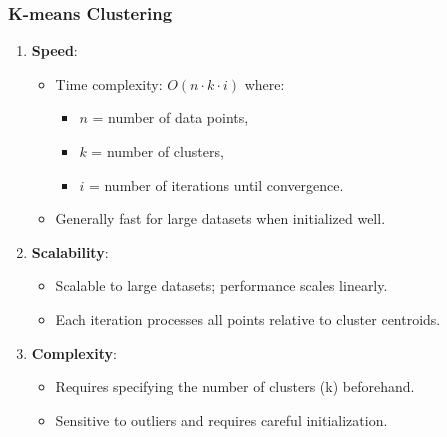 \documentclass{beamer}
\begin{document}
\begin{frame}[fragile]
    \frametitle{K-means Clustering}
    \begin{enumerate}
        \item \textbf{Speed}:
        \begin{itemize}
            \item Time complexity: \( O(n \cdot k \cdot i) \) where:
            \begin{itemize}
                \item \( n \) = number of data points,
                \item \( k \) = number of clusters,
                \item \( i \) = number of iterations until convergence.
            \end{itemize}
            \item Generally fast for large datasets when initialized well.
        \end{itemize}
        
        \item \textbf{Scalability}:
        \begin{itemize}
            \item Scalable to large datasets; performance scales linearly.
            \item Each iteration processes all points relative to cluster centroids.
        \end{itemize}

        \item \textbf{Complexity}:
        \begin{itemize}
            \item Requires specifying the number of clusters (k) beforehand.
            \item Sensitive to outliers and requires careful initialization.
        \end{itemize}
    \end{enumerate}
\end{frame}
\end{document}
